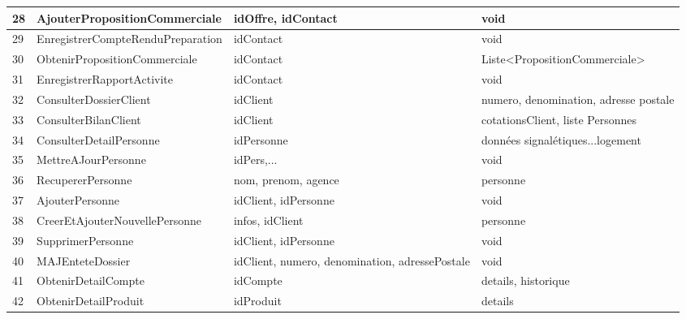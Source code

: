 \begin{table}
{\begin{tabular}{p{1cm}|p{5cm}p{6cm}p{6cm}}
            28 & AjouterPropositionCommerciale      & idOffre, idContact                                            & void\\ \hline
            29 & EnregistrerCompteRenduPreparation  & idContact                                                     & void\\ \hline
            30 & ObtenirPropositionCommerciale      & idContact                                                     & Liste<PropositionCommerciale>\\ \hline
            31 & EnregistrerRapportActivite         & idContact                                                     & void\\ \hline
            32 & ConsulterDossierClient             & idClient                                                      & numero, denomination, adresse postale\\ \hline
            33 & ConsulterBilanClient               & idClient                                                      & cotationsClient, liste Personnes\\ \hline
            34 & ConsulterDetailPersonne            & idPersonne                                                    & données signalétiques...logement\\ \hline
            35 & MettreAJourPersonne                & idPers,...                                                    & void\\ \hline
            36 & RecupererPersonne                  & nom, prenom, agence                                           & personne\\ \hline
            37 & AjouterPersonne                    & idClient, idPersonne                                          & void\\ \hline
            38 & CreerEtAjouterNouvellePersonne     & infos, idClient                                               & personne\\ \hline
            39 & SupprimerPersonne                  & idClient, idPersonne                                          & void\\ \hline
            40 & MAJEnteteDossier                   & idClient, numero, denomination, adressePostale                & void\\ \hline
            41 & ObtenirDetailCompte                & idCompte                                                      & details, historique\\ \hline
            42 & ObtenirDetailProduit               & idProduit                                                     & details\\ \hline

\end{tabular}}
\end{table}
